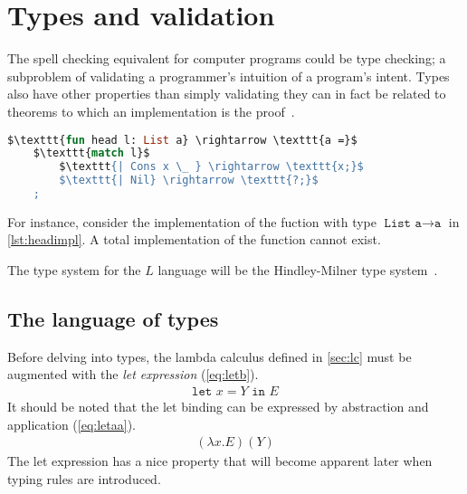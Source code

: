 \documentclass[11pt,oneside,a4paper]{report}
\begin{document}
\section{Types and validation}
\label{sec:types}
The spell checking equivalent for computer programs could be type checking; a subproblem of validating a programmer's intuition of a program's intent.
Types also have other properties than simply validating they can in fact be related to theorems to which an implementation is the proof~\cite{howard1980formulae}.
\begin{lstlisting}[language=ML,caption={Head implementation},label={lst:headimpl},mathescape=true]
$\texttt{fun head l: List a} \rightarrow \texttt{a =}$
    $\texttt{match l}$
        $\texttt{| Cons x \_ } \rightarrow \texttt{x;}$
        $\texttt{| Nil} \rightarrow \texttt{?;}$
    ;
\end{lstlisting}
For instance, consider the implementation of the fuction with type $\texttt{List a} \rightarrow \texttt{a}$ in \autoref{lst:headimpl}.
A total implementation of the function cannot exist.

The type system for the $L$ language will be the Hindley-Milner type system~\cite{hindley1969principal,milner1978theory}.

\subsection{The language of types}
Before delving into types, the lambda calculus defined in \autoref{sec:lc} must be augmented with the \textit{let expression} (\autoref{eq:letb}).
\begin{align}
	\texttt{let } x = Y \texttt{ in } E
	\label{eq:letb}
\end{align}
It should be noted that the let binding can be expressed by abstraction and application (\autoref{eq:letaa}).
\begin{align}
	(\lambda x . E) (Y)
	\label{eq:letaa}
\end{align}
The let expression has a nice property that will become apparent later when typing rules are introduced.
\end{document}
